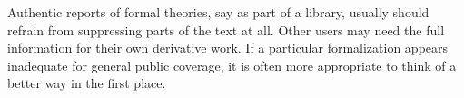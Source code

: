 \begin{isabellebody}
\begin{isamarkuptext}
  \medskip Authentic reports of formal theories, say as part of a
  library, usually should refrain from suppressing parts of the text
  at all.  Other users may need the full information for their own
  derivative work.  If a particular formalization appears inadequate
  for general public coverage, it is often more appropriate to think
  of a better way in the first place.%
\end{isamarkuptext}%
\isamarkuptrue%
\isamarkupfalse%
\end{isabellebody}%
